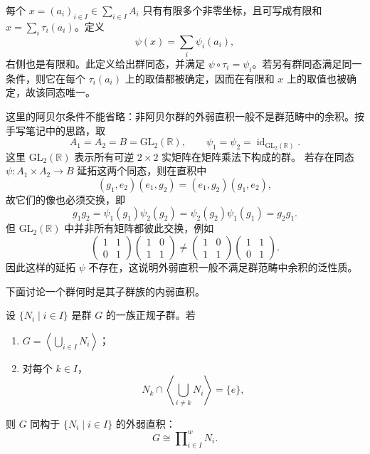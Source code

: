 \begin{purpleproof}
每个 $x=(a_i)_{i\in I}\in\sum_{i\in I}A_i$ 只有有限多个非零坐标，且可写成有限和 $x=\sum_i\tau_i(a_i)$。定义
\[
  \psi(x)=\sum_i\psi_i(a_i),
\]
右侧也是有限和。此定义给出群同态，并满足 $\psi\circ\tau_i=\psi_i$。若另有群同态满足同一条件，则它在每个 $\tau_i(a_i)$ 上的取值都被确定，因而在有限和 $x$ 上的取值也被确定，故该同态唯一。
\end{purpleproof}

\begin{purplenote}
这里的阿贝尔条件不能省略：非阿贝尔群的外弱直积一般不是群范畴中的余积。按手写笔记中的思路，取
\[
  A_1=A_2=B=\mathrm{GL}_2(\mathbb R),
  \qquad \psi_1=\psi_2=\operatorname{id}_{\mathrm{GL}_2(\mathbb R)}.
\]
这里 $\mathrm{GL}_2(\mathbb R)$ 表示所有可逆 $2\times2$ 实矩阵在矩阵乘法下构成的群。
若存在同态 $\psi:A_1\times A_2\to B$ 延拓这两个同态，则在直积中
\[
  (g_1,e_2)(e_1,g_2)=(e_1,g_2)(g_1,e_2),
\]
故它们的像也必须交换，即
\[
  g_1g_2=\psi_1(g_1)\psi_2(g_2)
  =\psi_2(g_2)\psi_1(g_1)=g_2g_1.
\]
但 $\mathrm{GL}_2(\mathbb R)$ 中并非所有矩阵都彼此交换，例如
\[
  \begin{pmatrix}1&1\\0&1\end{pmatrix}
  \begin{pmatrix}1&0\\1&1\end{pmatrix}
  \neq
  \begin{pmatrix}1&0\\1&1\end{pmatrix}
  \begin{pmatrix}1&1\\0&1\end{pmatrix}.
\]
因此这样的延拓 $\psi$ 不存在，这说明外弱直积一般不满足群范畴中余积的泛性质。

下面讨论一个群何时是其子群族的内弱直积。
\end{purplenote}

\begin{theorem}\label{thm:internal-weak-direct-product}
设 $\{N_i\mid i\in I\}$ 是群 $G$ 的一族正规子群。若
\begin{enumerate}[label=(\roman*)]
  \item $G=\left\langle\bigcup_{i\in I}N_i\right\rangle$；
  \item 对每个 $k\in I$，
  \[
    N_k\cap\left\langle\bigcup_{i\neq k}N_i\right\rangle=\{e\},
  \]
\end{enumerate}
则 $G$ 同构于 $\{N_i\mid i\in I\}$ 的外弱直积：
\[
  G\cong\prod\nolimits_{i\in I}^{w}N_i.
\]
\end{theorem}

